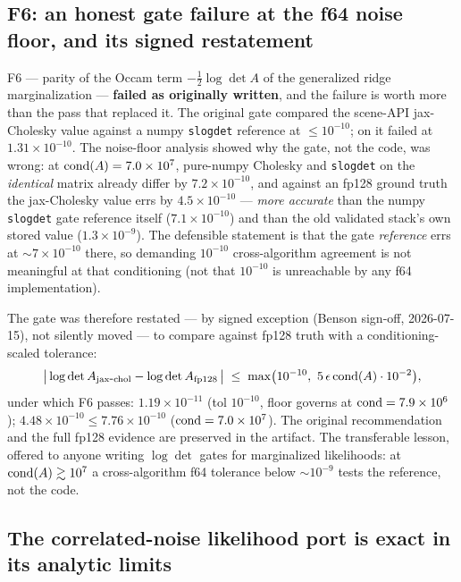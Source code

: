 \subsection{F6: an honest gate failure at the f64 noise floor, and its
            signed restatement}
\label{sec:f6}

F6 --- parity of the Occam term $-\tfrac12\log\det A$ of the generalized
ridge marginalization --- \textbf{failed as originally written}, and the
failure is worth more than the pass that replaced it. The original gate
compared the scene-API jax-Cholesky value against a numpy
\texttt{slogdet} reference at $\le10^{-10}$; on  it failed at
$1.31\times10^{-10}$. The noise-floor analysis showed why the
gate, not the code, was wrong: at ${\rm cond}(A)=7.0\times10^{7}$, pure-numpy
Cholesky and \texttt{slogdet} on the \emph{identical} matrix already differ
by $7.2\times10^{-10}$, and against an fp128 ground truth the jax-Cholesky
value errs by $4.5\times10^{-10}$ --- \emph{more accurate} than the numpy
\texttt{slogdet} gate reference itself ($7.1\times10^{-10}$) and than the old
validated stack's own stored value ($1.3\times10^{-9}$). The defensible
statement is that the gate \emph{reference} errs at $\sim$$7\times10^{-10}$
there, so demanding $10^{-10}$ cross-algorithm agreement is not meaningful at
that conditioning (not that $10^{-10}$ is unreachable by any f64
implementation).

The gate was therefore restated --- by signed exception (Benson sign-off,
2026-07-15), not silently moved --- to compare against fp128 truth with a
conditioning-scaled tolerance:
\[
  \bigl|\,\log\det A_{\rm jax\mbox{-}chol} - \log\det A_{\rm fp128}\,\bigr|
  \;\le\; \max\bigl(10^{-10},\ 5\,\epsilon\,\mathrm{cond}(A)\cdot10^{-2}\bigr),
\]
under which F6 passes:  $1.19\times10^{-11}$ (tol $10^{-10}$,
floor governs at ${\rm cond}=7.9\times10^{6}$); 
$4.48\times10^{-10} \le 7.76\times10^{-10}$ (${\rm cond}=7.0\times10^{7}$).
The original recommendation and the full fp128 evidence are preserved in the
artifact. The
transferable lesson, offered to anyone writing $\log\det$ gates for
marginalized likelihoods: at ${\rm cond}(A)\gtrsim10^{7}$ a cross-algorithm
f64 tolerance below $\sim$$10^{-9}$ tests the reference, not the code.

\subsection{The correlated-noise likelihood port is exact in its analytic
            limits}
\label{sec:corrport}

